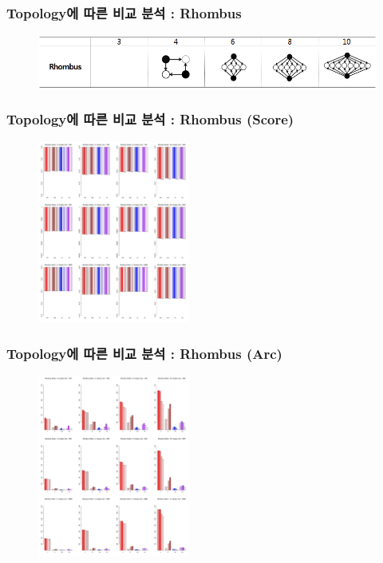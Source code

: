 \documentclass{beamer}
\begin{document}
\begin{frame}
\frametitle{Topology에 따른 비교 분석 : Rhombus}
{\scriptsize{}
	\begin{figure}
		\includegraphics[height=50pt]{images/Topologies_Rhombus}
	\end{figure}	
}
\end{frame}



\begin{frame}
\frametitle{Topology에 따른 비교 분석 : Rhombus (Score)}
{\scriptsize{}
	\begin{figure}
		\includegraphics[height=170pt]{images/06_Rhombus_Score}
	\end{figure}	
}
\end{frame}


\begin{frame}
\frametitle{Topology에 따른 비교 분석 : Rhombus (Arc)}
{\scriptsize{}
	\begin{figure}
		\includegraphics[height=170pt]{images/06_Rhombus_Arcs}
	\end{figure}	
}
\end{frame}
\end{document}
